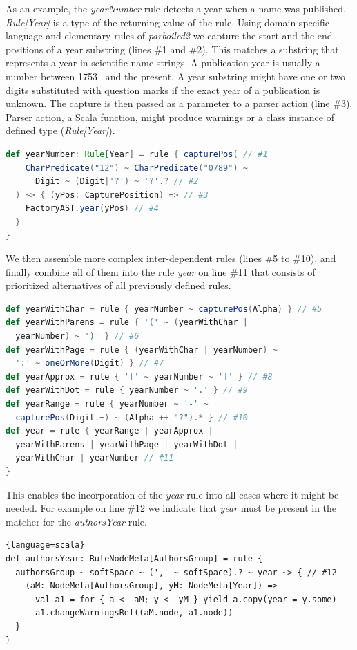 \documentclass{bmcart}
\begin{document}
As an example, the \textit{yearNumber} rule detects a year when a name was published. \textit{Rule[Year]} is a type of the returning value of the rule. Using domain-specific language and elementary rules of \textit{parboiled2} we capture the start and the end positions of a year substring (lines \#1 and \#2). This matches a substring that represents a year in scientific name-strings. A publication year is usually a number between 1753~\cite{Linne1753} and the present. A year substring might have one or two digits substituted with question marks if the exact year of a publication is unknown. The capture is then passed as a parameter to a parser action (line \#3). Parser action,  a Scala function, might produce warnings or a class instance of defined type (\textit{Rule[Year]}).

\begin{lstlisting}[language=scala]
def yearNumber: Rule[Year] = rule { capturePos( // #1
    CharPredicate("12") ~ CharPredicate("0789") ~
      Digit ~ (Digit|'?') ~ '?'.? // #2
  ) ~> { (yPos: CapturePosition) => // #3
    FactoryAST.year(yPos) // #4
  }
}
\end{lstlisting}

We then assemble more complex inter-dependent rules (lines \#5 to \#10), and finally combine all of them into the rule \textit{year} on line \#11 that consists of prioritized alternatives of all previously defined rules.

\begin{lstlisting}[language=scala]
def yearWithChar = rule { yearNumber ~ capturePos(Alpha) } // #5
def yearWithParens = rule { '(' ~ (yearWithChar |
  yearNumber) ~ ')' } // #6
def yearWithPage = rule { (yearWithChar | yearNumber) ~
  ':' ~ oneOrMore(Digit) } // #7
def yearApprox = rule { '[' ~ yearNumber ~ ']' } // #8
def yearWithDot = rule { yearNumber ~ '.' } // #9
def yearRange = rule { yearNumber ~ '-' ~
  capturePos(Digit.+) ~ (Alpha ++ "?").* } // #10
def year = rule { yearRange | yearApprox |
  yearWithParens | yearWithPage | yearWithDot |
  yearWithChar | yearNumber // #11
}
\end{lstlisting}

This enables the incorporation of the \textit{year} rule into all cases where it might be needed. For example on line \#12 we indicate that \textit{year} must be present in the matcher for the \textit{authorsYear} rule.

\begin{lstlisting}{language=scala}
def authorsYear: RuleNodeMeta[AuthorsGroup] = rule {
  authorsGroup ~ softSpace ~ (',' ~ softSpace).? ~ year ~> { // #12
    (aM: NodeMeta[AuthorsGroup], yM: NodeMeta[Year]) =>
      val a1 = for { a <- aM; y <- yM } yield a.copy(year = y.some)
      a1.changeWarningsRef((aM.node, a1.node))
  }
}
\end{lstlisting}
\end{document}
